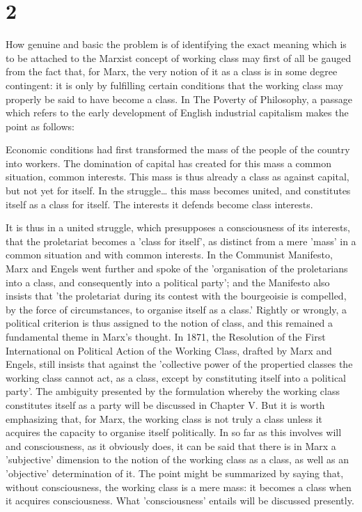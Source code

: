 \section*{2}
How genuine and basic the problem is of identifying the exact meaning which is to be attached to the Marxist concept of working class may first of all be gauged from the fact that, for Marx, the very notion of it as a class is in some degree contingent: it is only by fulfilling certain conditions that the working class may properly be said to have become a class. In The Poverty of Philosophy, a passage which refers to the early development of English industrial capitalism makes the point as follows:
\begin{displayquote}
    Economic conditions had first transformed the mass of the people of the country into workers. The domination of capital has created for this mass a common situation, common interests. This mass is thus already a class as against capital, but not yet for itself. In the struggle\dots{} this mass becomes united, and constitutes itself as a class for itself. The interests it defends become class interests.
\end{displayquote}

It is thus in a united struggle, which presupposes a consciousness of its interests, that the proletariat becomes a 'class for itself', as distinct from a mere 'mass' in a common situation and with common interests. In the Communist Manifesto, Marx and Engels went further and spoke of the 'organisation of the proletarians into a class, and consequently into a political party'; and the Manifesto also insists that 'the proletariat during its contest with the bourgeoisie is compelled, by the force of circumstances, to organise itself as a class.' Rightly or wrongly, a political criterion is thus assigned to the notion of class, and this remained a fundamental theme in Marx's thought. In 1871, the Resolution of the First International on Political Action of the Working Class, drafted by Marx and Engels, still insists that against the 'collective power of the propertied classes the working class cannot act, as a class, except by constituting itself into a political party'. The ambiguity presented by the formulation whereby the working class constitutes itself as a party will be discussed in Chapter V. But it is worth emphasizing that, for Marx, the working class is not truly a class unless it acquires the capacity to organise itself politically. In so far as this involves will and consciousness, as it obviously does, it can be said that there is in Marx a 'subjective' dimension to the notion of the working class as a class, as well as an 'objective' determination of it. The point might be summarized by saying that, without consciousness, the working class is a mere mass: it becomes a class when it acquires consciousness. What 'consciousness' entails will be discussed presently.

